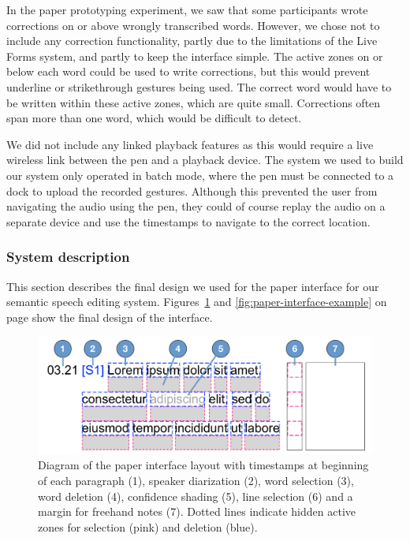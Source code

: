 In the paper prototyping experiment, we saw that some participants wrote corrections on or above wrongly transcribed
words. However, we chose not to include any correction functionality, partly due to the limitations of the Live Forms
system, and partly to keep the interface simple. The active zones on or below each word could be used to write
corrections, but this would prevent underline or strikethrough gestures being used. The correct word would have to be
written within these active zones, which are quite small. Corrections often span more than one word, which would be
difficult to detect.

We did not include any linked playback features as this would require a live wireless link between the pen and a
playback device. The system we used to build our system only operated in batch mode, where the pen must be
connected to a dock to upload the recorded gestures. Although this prevented the user from navigating the audio using
the pen, they could of course replay the audio on a separate device and use the timestamps to navigate to the correct
location.

\subsubsection{System description}

This section describes the final design we used for the paper interface for our semantic speech editing system.
Figures~\ref{fig:paper-interface-diagram} and \ref{fig:paper-interface-example} on page
\pageref{fig:paper-interface-diagram} show the final design of the interface.

\begin{figure}[p]
  \centering
  \includegraphics[width=\columnwidth]{figs/paper-interface-diagram.pdf}
  \caption{Diagram of the paper interface layout with timestamps at beginning of each paragraph (1), speaker
  diarization (2), word selection (3), word deletion (4), confidence shading (5), line selection (6) and a margin for
  freehand notes (7). Dotted lines indicate hidden active zones for selection (pink) and deletion (blue).}
  \label{fig:paper-interface-diagram}
\end{figure}

